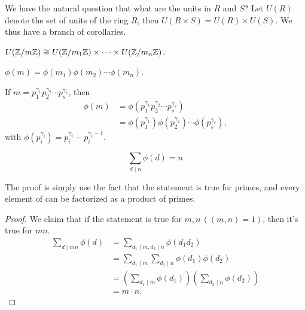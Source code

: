 \documentclass{mynotes}
\begin{document}
We have the natural question that what are the units in $R$ and $S$? Let $U(R)$ denote the set of units of the ring $R$, then $U(R\times S) = U(R)\times U(S)$.
We thus have a branch of corollaries.
\begin{corollary}
$U(\mathbb{Z}/m\mathbb{Z}) \cong U(\mathbb{Z}/m_1\mathbb{Z})\times \cdots\times U(\mathbb{Z}/m_n\mathbb{Z})$.
\end{corollary}
\begin{corollary}
$\phi(m) = \phi(m_1)\phi(m_2)\cdots\phi(m_n)$.
\end{corollary}
\begin{corollary}
If $m = p_1^{\gamma_1}p_2^{\gamma_2}\cdots p_s^{\gamma_s}$, then 
\begin{align*}
\phi(m) &= \phi(p_1^{\gamma_1}p_2^{\gamma_2}\cdots p_s^{\gamma_s})\\
&=\phi(p_1^{\gamma_1})\phi(p_2^{\gamma_2})\cdots\phi(p_s^{\gamma_s}), 
\end{align*}
with $\phi(p_i^{\gamma_i}) = p_i^{\gamma_i} -p_i^{\gamma_i-1}$.
\end{corollary}
\begin{corollary}
$$\sum_{d\mid n}\phi(d) = n$$
\end{corollary}
The proof is simply use the fact that the statement is true for primes, and every element of \Z can be factorized as a product of primes.
\begin{proof}
We claim that if the statement is true for $m,n\,((m,n) = 1)$, then it's true for $mn$.
\begin{align*}
\sum_{d\mid mn} \phi(d) &=\sum_{d_1\mid m,d_2\mid n} \phi(d_1d_2)\\
&= \sum_{d_1\mid m}\sum_{d_2\mid n} \phi(d_1)\phi(d_2)\\&=(\sum_{d_1\mid m}\phi(d_1))(\sum_{d_2\mid n}\phi(d_2))\\
&= m\cdot n.
\end{align*}
\end{proof}
\end{document}
